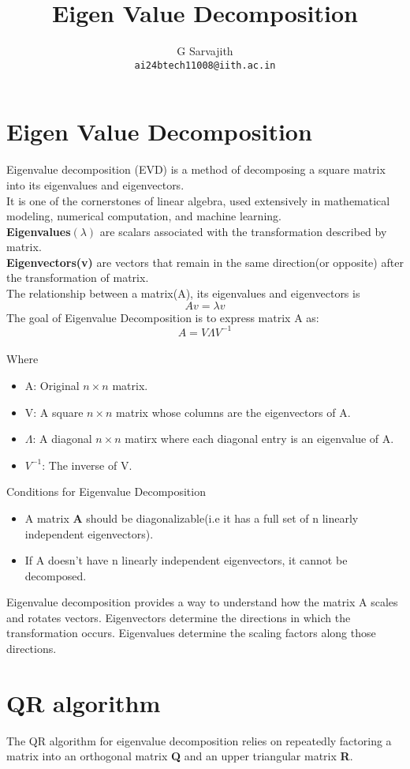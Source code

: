 \documentclass{article}
\title{Eigen Value Decomposition}
\author{%
G Sarvajith\\
\texttt{ai24btech11008@iith.ac.in}\\
}
\begin{document}
\maketitle
\section{Eigen Value Decomposition}
Eigenvalue decomposition (EVD) is a method of decomposing a square matrix into its eigenvalues and eigenvectors. \\It is one of the cornerstones of linear algebra, used extensively in mathematical modeling, numerical computation, and machine learning.\\
\textbf{Eigenvalues}$(\lambda)$ are scalars associated with the transformation described by matrix.\\
\textbf{Eigenvectors(v)} are vectors that remain in the same direction(or opposite) after the transformation of matrix.\\
The relationship between a matrix(A), its eigenvalues and eigenvectors is$$Av=\lambda v$$
The goal of Eigenvalue Decomposition is to express matrix A as:$$A =V\Lambda V^{-1}$$\\ 
Where
\begin{itemize}
 \item A: Original $n\times n$ matrix.
 \item V: A square $n\times n$ matrix whose columns are the eigenvectors of A.
 \item $\Lambda$: A diagonal $n\times n$ matirx where each diagonal entry is an eigenvalue of A. 
 \item $V^{-1}$: The inverse of V.
\end{itemize}
Conditions for Eigenvalue Decomposition\\
\begin{itemize}
    \item A matrix \textbf{A} should be diagonalizable(i.e it has a full set of n linearly independent eigenvectors).
    \item If A doesn't have n linearly independent eigenvectors, it cannot be decomposed.
\end{itemize}
Eigenvalue decomposition provides a way to understand how the matrix A scales and rotates vectors. Eigenvectors determine the directions in which the transformation occurs.
Eigenvalues determine the scaling factors along those directions.\\
\section{QR algorithm }
The QR algorithm for eigenvalue decomposition relies on repeatedly factoring a matrix into an orthogonal matrix \textbf{Q} and an upper triangular matrix \textbf{R}.
\end{document}
